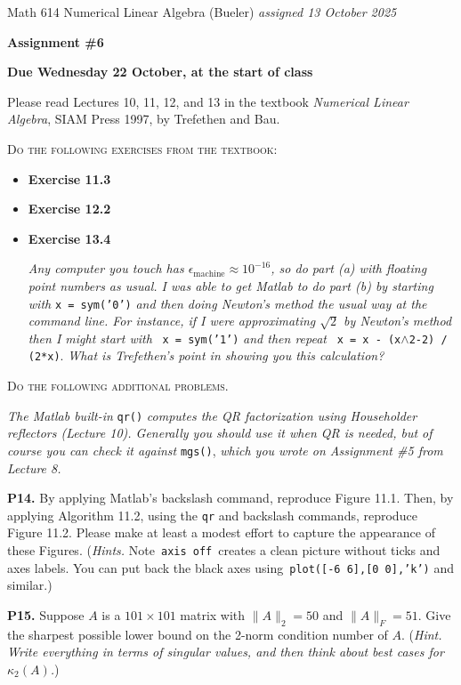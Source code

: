 \documentclass[12pt,dvipsnames]{amsart}
\newcommand{\eps}{\epsilon}
\newcommand{\prob}[1]{\bigskip\noindent\textbf{#1.}\quad }
\begin{document}
\scriptsize \noindent Math 614 Numerical Linear Algebra (Bueler) \hfill \emph{assigned 13 October 2025}
\normalsize\medskip

\Large\centerline{\textbf{Assignment \#6}}
\large
\medskip

\centerline{\textbf{Due Wednesday 22 October, at the start of class}}
\medskip
\normalsize

\thispagestyle{empty}

\bigskip

\noindent Please read Lectures 10, 11, 12, and 13 in the textbook \emph{Numerical Linear Algebra}, SIAM Press 1997, by Trefethen and Bau.

\bigskip
\noindent \textsc{Do the following exercises from the textbook}:

\begin{itemize}[itemsep=4pt]
\item \textbf{Exercise 11.3}
\item \textbf{Exercise 12.2}
\item \textbf{Exercise 13.4}  \quad\, \begin{minipage}[t]{0.68\textwidth}   \emph{Any computer you touch has $\eps_{\text{machine}}\approx 10^{-16}$, so do part (a) with floating point numbers as usual.  I was able to get Matlab to do part (b) by starting with} {\small \texttt{x = sym('0')}} \emph{and then doing Newton's method the usual way at the command line.  For instance, if I were approximating $\sqrt{2}$ by Newton's method then I might start with} \, {\small \texttt{x = sym('1')}} \emph{and then repeat} \, {\small \texttt{x = x - (x$\wedge$2-2) / (2*x)}}.  \emph{What is Trefethen's point in showing you this calculation?}\end{minipage}
\end{itemize}


\medskip
\noindent \textsc{Do the following additional problems.}

\medskip
\noindent \emph{The Matlab built-in} \texttt{qr()} \emph{computes the QR factorization using Householder reflectors (Lecture 10).  Generally you should use it when QR is needed, but of course you can check it against} \texttt{mgs()}, \emph{which you wrote on Assignment \#5 from Lecture 8.}

\prob{P14}  By applying Matlab's backslash command, reproduce Figure 11.1.  Then, by applying Algorithm 11.2, using the \texttt{qr} and backslash commands, reproduce Figure 11.2.  Please make at least a modest effort to capture the appearance of these Figures.  (\emph{Hints.}  Note \,\texttt{axis off}\, creates a clean picture without ticks and axes labels.  You can put back the black axes using\, \texttt{plot([-6 6],[0 0],'k')} and similar.)

\prob{P15}  Suppose $A$ is a $101\times 101$ matrix with $\|A\|_2=50$ and $\|A\|_F=51$.  Give the sharpest possible lower bound on the 2-norm condition number of $A$.  (\emph{Hint.  Write everything in terms of singular values, and then think about best cases for $\kappa_2(A)$.})
\end{document}
